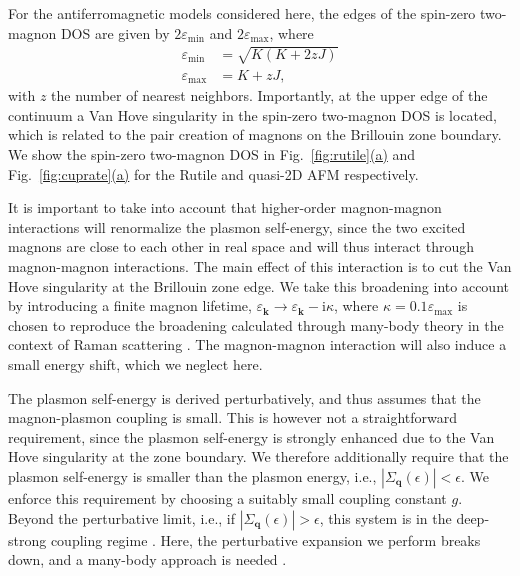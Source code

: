 \documentclass[aps,prb,reprint,twocolumns,superscriptaddress,nofootinbib]{revtex4-2}
\newcommand{\ii}{\mathrm{i}}
\newcommand{\subfigref}[2]{Fig.~\hyperref[#1]{\ref*{#1}#2}}
\begin{document}
	For the antiferromagnetic models considered here, the edges of the spin-zero two-magnon DOS are given by
	 $2\varepsilon_{\mathrm{min}}$ and $2\varepsilon_{\mathrm{max}}$, where
	 \begin{align}
	 	\varepsilon_{\mathrm{min}}&=\sqrt{K(K+2zJ)} \\
	 	\varepsilon_\mathrm{max}&=K+zJ,
	 \end{align}
	 with $z$ the number of nearest neighbors. Importantly, at the upper edge of the continuum a Van Hove singularity in the spin-zero two-magnon DOS is located, which is related to the pair creation of magnons on the Brillouin zone boundary. We show the spin-zero two-magnon DOS in \subfigref{fig:rutile}{(a)} and \subfigref{fig:cuprate}{(a)} for the Rutile and quasi-2D AFM respectively. 
	 
	
	
	
	It is important to take into account that higher-order magnon-magnon interactions will renormalize the plasmon self-energy, since the two excited magnons  are close to each other in real space and will thus interact through magnon-magnon interactions. The main effect of this interaction is to cut the Van Hove singularity at the Brillouin zone edge. We take this broadening into account by introducing a finite magnon lifetime, $\varepsilon_{\bm k} \rightarrow \varepsilon_{\bm k}-\ii \kappa$, where $\kappa=0.1\varepsilon_{\mathrm{max}}$ is chosen to reproduce the broadening calculated through many-body theory in the context of Raman scattering \cite{canaliTheoryRamanScattering1992}. The magnon-magnon interaction will also induce a small energy shift, which we neglect here.
	
	The plasmon self-energy is derived perturbatively, and thus assumes that the magnon-plasmon coupling is small. This is however not a straightforward requirement, since the plasmon self-energy is strongly enhanced due to the Van Hove singularity at the zone boundary. We therefore additionally require that the plasmon self-energy is smaller than the plasmon energy, i.e., $|\Sigma_{\bm q}(\epsilon)|<\epsilon$. We enforce this requirement by choosing a suitably small coupling constant $g$. Beyond the perturbative limit, i.e., if $|\Sigma_{\bm q}(\epsilon)|>\epsilon$, this system is in the deep-strong coupling regime \cite{friskkockumUltrastrongCouplingLight2019}. Here, the perturbative expansion we perform breaks down, and a many-body approach is needed \cite{verresenAvoidedQuasiparticleDecay2019}.
	
	
\end{document}
